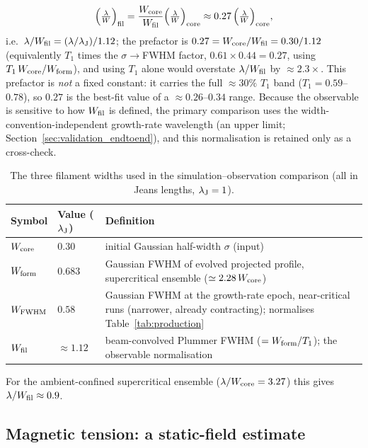 \documentclass[usenatbib,twoside,twocolumn]{mnras}
\begin{document}
\begin{equation}
\Big(\tfrac{\lambda}{W}\Big)_{\rm fil} = \frac{W_{\rm core}}{W_{\rm fil}}\Big(\tfrac{\lambda}{W}\Big)_{\rm core} \approx 0.27\,\Big(\tfrac{\lambda}{W}\Big)_{\rm core},
\label{eq:t1_apply}
\end{equation}
i.e.\ $\lambda/W_{\rm fil}=(\lambda/\lambda_{\rm J})/1.12$; the prefactor is $0.27=W_{\rm core}/W_{\rm fil}=0.30/1.12$ (equivalently $T_1$ times the $\sigma\!\to\!$FWHM factor, $0.61\times0.44=0.27$, using $T_1\,W_{\rm core}/W_{\rm form}$), and using $T_1$ alone would overstate $\lambda/W_{\rm fil}$ by $\approx2.3\times$. This prefactor is \emph{not} a fixed constant: it carries the full $\approx30\%$ $T_1$ band ($T_1=0.59$--$0.78$), so $0.27$ is the best-fit value of a $\approx0.26$--$0.34$ range. Because the observable is sensitive to how $W_{\rm fil}$ is defined, the primary comparison uses the width-convention-independent growth-rate wavelength (an upper limit; Section~\ref{sec:validation_endtoend}), and this normalisation is retained only as a cross-check.

\begin{table}
\caption{The three filament widths used in the simulation--observation comparison (all in Jeans lengths, $\lambda_{\rm J}=1$).}
\label{tab:widthdefs}
\footnotesize
\setlength{\tabcolsep}{3pt}
\begin{tabular}{p{1.5cm}p{1.4cm}p{4.0cm}}
\toprule
Symbol & Value ($\lambda_{\rm J}$) & Definition \\
\midrule
$W_{\rm core}$ & $0.30$ & initial Gaussian half-width $\sigma$ (input) \\
$W_{\rm form}$ & $0.683$ & Gaussian FWHM of evolved projected profile, supercritical ensemble ($\simeq2.28\,W_{\rm core}$) \\
$W_{\rm FWHM}$ & $0.58$ & Gaussian FWHM at the growth-rate epoch, near-critical runs (narrower, already contracting); normalises Table~\ref{tab:production} \\
$W_{\rm fil}$ & $\approx1.12$ & beam-convolved Plummer FWHM ($=W_{\rm form}/T_1$); the observable normalisation \\
\bottomrule
\end{tabular}
\end{table}

For the ambient-confined supercritical ensemble ($\lambda/W_{\rm core}=3.27$) this gives $\lambda/W_{\rm fil}\approx0.9$.

\subsection{Magnetic tension: a static-field estimate}
\label{sec:magnetic}
\end{document}
